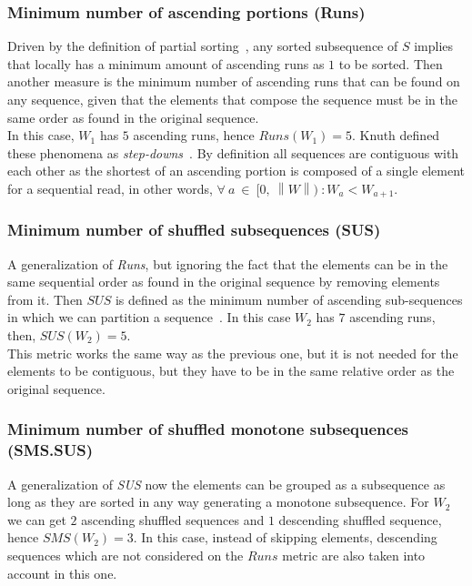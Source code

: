 \subsubsection{Minimum number of ascending portions (Runs)}
Driven by the definition of partial sorting~\cite{10.5555/1614191}, any sorted subsequence of $S$ implies that locally has a minimum amount of ascending runs as $1$ to be sorted. Then another measure is the minimum number of ascending runs that can be found on any sequence, given that the elements that compose the sequence must be in the same order as found in the original sequence.\\

In this case, $W_1$ has $5$ ascending runs, hence $Runs(W_1) =5$. Knuth defined these phenomena as \textit{step-downs}~\cite{10.5555/270146}. By definition all sequences are contiguous with each other as the shortest of an ascending portion is composed of a single element for a sequential read, in other words, $\forall~a~\in~[0,~\left\|W\right\|)~: W_a < W_{a+1}$.\\

\subsubsection{Minimum number of shuffled subsequences (SUS)}
A generalization of \textit{Runs}, but ignoring the fact that the elements can be in the same sequential order as found in the original sequence by removing elements from it. Then $SUS$ is defined as the minimum number of ascending sub-sequences in which we can partition a sequence~\cite{Carlsson_Levcopoulos_Petersson_1993}. In this case $W_2$ has $7$ ascending runs, then, $SUS(W_2) = 5$.\\

This metric works the same way as the previous one, but it is not needed for the elements to be contiguous, but they have to be in the same relative order as the original sequence.\\


\subsubsection{Minimum number of shuffled monotone subsequences (SMS.SUS)}
A generalization of \textit{SUS} now the elements can be grouped as a subsequence as long as they are sorted in any way generating a monotone subsequence. For $W_2$ we can get $2$ ascending shuffled sequences\cite{Carlsson_Levcopoulos_Petersson_1993} and $1$ descending shuffled sequence, hence $SMS(W_2) = 3$. In this case, instead of skipping elements, descending sequences which are not considered on the $Runs$ metric are also taken into account in this one.\\



